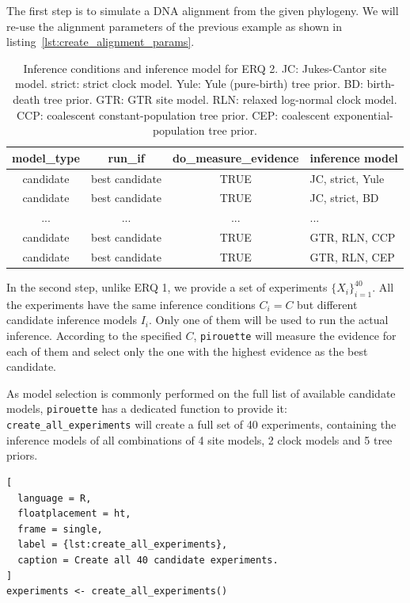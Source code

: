The first step is to simulate a DNA alignment from the 
given phylogeny. 
We will re-use the alignment parameters of the previous example 
as shown in listing~\ref{lst:create_alignment_params}.

\begin{table}
  \begin{tabular}{ | c | c | c | l | }
    \hline
    \textbf{model\_type} &
    \textbf{run\_if} & \textbf{do\_measure\_evidence} & 
    \textbf{inference model} \\ 
    \hline
    candidate & best candidate & TRUE & JC, strict, Yule \\
    candidate & best candidate & TRUE & JC, strict, BD   \\
    ...       & ...            & ... & ...              \\
    candidate & best candidate & TRUE & GTR, RLN, CCP    \\
    candidate & best candidate & TRUE & GTR, RLN, CEP    \\
    \hline
  \end{tabular}
  \caption{
    Inference conditions and inference model for ERQ 2.
    JC: Jukes-Cantor site model.
    strict: strict clock model.
    Yule: Yule (pure-birth) tree prior.
    BD: birth-death tree prior.
    GTR: GTR site model.
    RLN: relaxed log-normal clock model.
    CCP: coalescent constant-population tree prior.
    CEP: coalescent exponential-population tree prior.
  }
  \label{tab:RQ2}
\end{table}

In the second step, unlike ERQ 1, we provide a 
set of experiments $\{\mathit{X_{i}}\}_{i=1}^{40}$. All the experiments have 
the same inference conditions $\mathit{C_{i}} = \mathit{C}$ but different 
candidate inference models $\mathit{I_{i}}$. Only one of them will be used 
to run the actual inference. According to the specified $\mathit{C}$, 
\verb;pirouette; will measure the evidence for each of them and select only 
the one with the highest evidence as the best candidate.

As model selection is commonly performed on the full list of available 
candidate models, \verb;pirouette; has a dedicated function to provide it:
\verb;create_all_experiments; will create a full set of 40 experiments,
containing the inference models of all combinations of 
4 site models, 2 clock models and 5 tree priors.

\begin{lstlisting}[
  language = R, 
  floatplacement = ht, 
  frame = single, 
  label = {lst:create_all_experiments},
  caption = Create all 40 candidate experiments.
]
experiments <- create_all_experiments()
\end{lstlisting}

